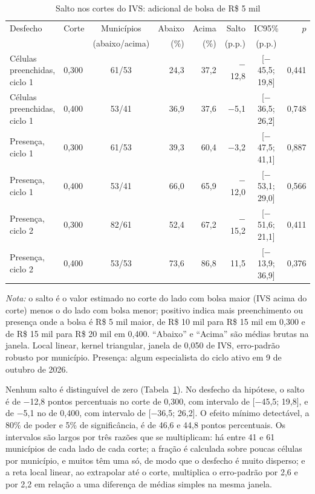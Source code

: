\documentclass[11pt,a4paper]{article}
\begin{document}
\begin{table}[htbp]
\centering
\footnotesize
\setlength{\tabcolsep}{4pt}
\caption{Salto nos cortes do IVS: adicional de bolsa de R\$ 5 mil}
\label{tab:bolsa}
\begin{tabular}{llcrrrcr}
\toprule
Desfecho & Corte & Municípios & Abaixo & Acima & Salto & IC95\% & $p$ \\
 & & (abaixo/acima) & (\%) & (\%) & (p.p.) & (p.p.) & \\
\midrule
Células preenchidas, ciclo 1 & 0,300 & 61/53 & 24,3 & 37,2 & $-$12,8 & [$-$45,5; 19,8] & 0,441 \\
Células preenchidas, ciclo 1 & 0,400 & 53/41 & 36,9 & 37,6 & $-$5,1 & [$-$36,5; 26,2] & 0,748 \\
Presença, ciclo 1 & 0,300 & 61/53 & 39,3 & 60,4 & $-$3,2 & [$-$47,5; 41,1] & 0,887 \\
Presença, ciclo 1 & 0,400 & 53/41 & 66,0 & 65,9 & $-$12,0 & [$-$53,1; 29,0] & 0,566 \\
Presença, ciclo 2 & 0,300 & 82/61 & 52,4 & 67,2 & $-$15,2 & [$-$51,6; 21,1] & 0,411 \\
Presença, ciclo 2 & 0,400 & 53/53 & 73,6 & 86,8 & 11,5 & [$-$13,9; 36,9] & 0,376 \\
\bottomrule
\end{tabular}

\vspace{2pt}
\begin{minipage}{0.94\textwidth}
\footnotesize \textit{Nota:} o salto é o valor estimado no corte do lado com
bolsa maior (IVS acima do corte) menos o do lado com bolsa menor; positivo
indica mais preenchimento ou presença onde a bolsa é R\$ 5 mil maior, de
R\$ 10 mil para R\$ 15 mil em 0,300 e de R\$ 15 mil para R\$ 20 mil em 0,400.
``Abaixo'' e ``Acima'' são médias brutas na janela. Local linear, kernel
triangular, janela de 0,050 de IVS, erro-padrão robusto por município.
Presença: algum especialista do ciclo ativo em 9 de outubro de 2026.
\end{minipage}
\end{table}

Nenhum salto é distinguível de zero (Tabela~\ref{tab:bolsa}). No desfecho da
hipótese, o salto é de $-$12,8 pontos percentuais no corte de 0,300, com
intervalo de [$-$45,5; 19,8], e de $-$5,1 no de 0,400, com intervalo de
[$-$36,5; 26,2]. O efeito mínimo detectável, a 80\% de poder e 5\% de
significância, é de 46,6 e 44,8 pontos percentuais. Os intervalos são largos
por três razões que se multiplicam: há entre 41 e 61 municípios de cada lado de
cada corte; a fração é calculada sobre poucas células por município, e muitos
têm uma só, de modo que o desfecho é muito disperso; e a reta local linear, ao
extrapolar até o corte, multiplica o erro-padrão por 2,6 e por 2,2 em relação a
uma diferença de médias simples na mesma janela.
\end{document}
